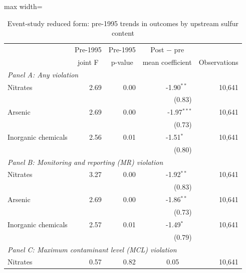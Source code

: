 \begin{table}[htbp]
\raggedright
\begin{minipage}{\linewidth}
\caption{\label{tab:es_rf_pretrend_k2} Event-study reduced form: pre-1995 trends in outcomes by upstream sulfur content}
\end{minipage}
\small
{\setlength{\tabcolsep}{4pt}%
\begin{adjustbox}{max width=\linewidth}
\begin{tabular}{p{5cm}rrrr}
\toprule
 & \multicolumn{1}{c}{Pre-1995} & \multicolumn{1}{c}{Pre-1995} & \multicolumn{1}{c}{Post $-$ pre} & \\
 & \multicolumn{1}{c}{joint F} & \multicolumn{1}{c}{p-value} & \multicolumn{1}{c}{mean coefficient} & \multicolumn{1}{c}{Observations} \\
\hline
\multicolumn{5}{l}{\textit{Panel A: Any violation}} \\
\quad Nitrates & 2.69 & 0.00 & \phantom{(}-1.90$^{**\phantom{*}}$ & 10,641 \\
 & & & (\phantom{-}0.83)\phantom{$^{***}$} & \\
\quad Arsenic & 2.69 & 0.00 & \phantom{(}-1.97$^{***}$ & 10,641 \\
 & & & (\phantom{-}0.73)\phantom{$^{***}$} & \\
\quad Inorganic chemicals & 2.56 & 0.01 & \phantom{(}-1.51$^{*\phantom{*}\phantom{*}}$ & 10,641 \\
 & & & (\phantom{-}0.80)\phantom{$^{***}$} & \\
\hline
\multicolumn{5}{l}{\textit{Panel B: Monitoring and reporting (MR) violation}} \\
\quad Nitrates & 3.27 & 0.00 & \phantom{(}-1.92$^{**\phantom{*}}$ & 10,641 \\
 & & & (\phantom{-}0.83)\phantom{$^{***}$} & \\
\quad Arsenic & 2.69 & 0.00 & \phantom{(}-1.86$^{**\phantom{*}}$ & 10,641 \\
 & & & (\phantom{-}0.73)\phantom{$^{***}$} & \\
\quad Inorganic chemicals & 2.57 & 0.01 & \phantom{(}-1.49$^{*\phantom{*}\phantom{*}}$ & 10,641 \\
 & & & (\phantom{-}0.79)\phantom{$^{***}$} & \\
\hline
\multicolumn{5}{l}{\textit{Panel C: Maximum contaminant level (MCL) violation}} \\
\quad Nitrates & 0.57 & 0.82 & \phantom{(}\phantom{-}0.05$^{\phantom{*}\phantom{*}\phantom{*}}$ & 10,641 \\

\end{tabular}
\end{adjustbox}}
\end{table}
